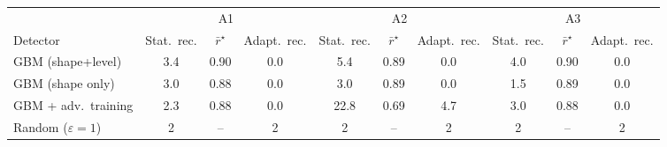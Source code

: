 \begin{tabular}{lccccccccc}
\toprule
 & \multicolumn{3}{c}{A1} & \multicolumn{3}{c}{A2} & \multicolumn{3}{c}{A3} \\
\cmidrule(lr){2-4}\cmidrule(lr){5-7}\cmidrule(lr){8-10}
Detector & Stat.\ rec. & $\bar r^\star$ & Adapt.\ rec. & Stat.\ rec. & $\bar r^\star$ & Adapt.\ rec. & Stat.\ rec. & $\bar r^\star$ & Adapt.\ rec. \\
\midrule
GBM (shape+level) & 3.4 & 0.90 & 0.0 & 5.4 & 0.89 & 0.0 & 4.0 & 0.90 & 0.0 \\
GBM (shape only) & 3.0 & 0.88 & 0.0 & 3.0 & 0.89 & 0.0 & 1.5 & 0.89 & 0.0 \\
GBM + adv.\ training & 2.3 & 0.88 & 0.0 & 22.8 & 0.69 & 4.7 & 3.0 & 0.88 & 0.0 \\
\midrule
Random ($\varepsilon{=}1$) & 2 & -- & 2 & 2 & -- & 2 & 2 & -- & 2 \\
\bottomrule
\end{tabular}
